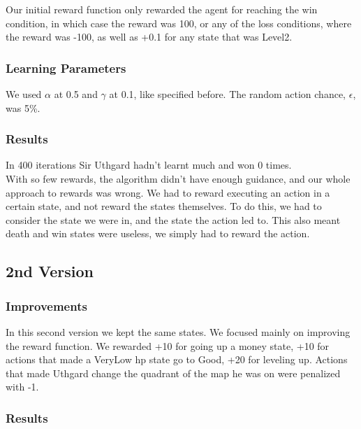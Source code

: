\documentclass{article}
\begin{document}
  Our initial reward function only rewarded the agent for reaching the win condition, in which case the reward was 100, or any of the loss conditions,
  where the reward was -100, as well as +0.1 for any state that was Level2.\\

  \subsubsection{Learning Parameters}

  We used $\alpha$ at 0.5 and $\gamma$ at 0.1, like specified before. The random action chance, $\epsilon$, was 5\%.\\

  \subsubsection{Results}

  In 400 iterations Sir Uthgard hadn't learnt much and won 0 times.\\
  With so few rewards, the algorithm didn't have enough guidance, and our whole approach to rewards was wrong. 
  We had to reward executing an action in a certain state, and not reward the states themselves. To do this, we had to consider the state we were in, and the state the action led to. 
  This also meant death and win states were useless, we simply had to reward the action.\\

  \subsection{2nd Version}

  \subsubsection{Improvements}

  In this second version we kept the same states. We focused mainly on improving the reward function.
  We rewarded +10 for going up a money state, +10 for actions that made a VeryLow hp state go to Good, +20 for leveling up. 
  Actions that made Uthgard change the quadrant of the map he was on were penalized with -1.

  \subsubsection{Results}
\end{document}
